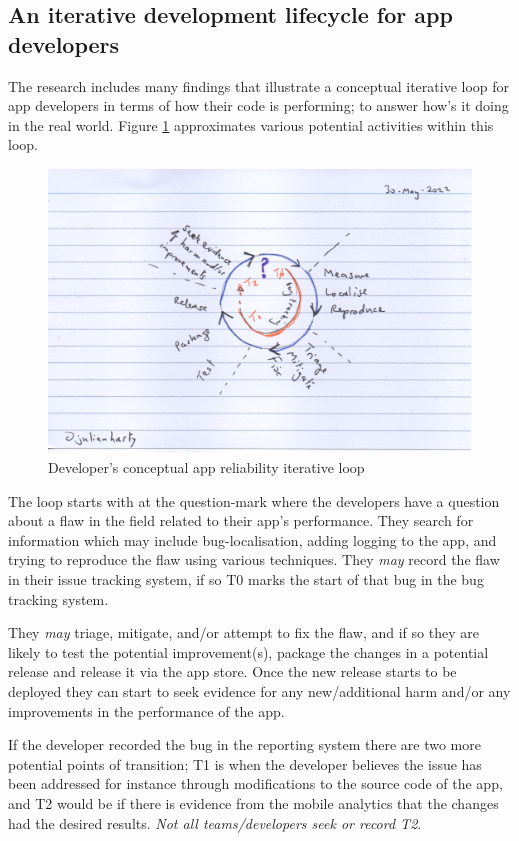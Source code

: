 \subsection{An iterative development lifecycle for app developers}
The research includes many findings that illustrate a conceptual iterative loop for app developers in terms of how their code is performing; to answer how's it doing in the real world. Figure \ref{fig:dev-app-reliability-iterative-loop} approximates various potential activities within this loop.

\begin{figure}
    \centering
    \includegraphics[width=12cm]{images/rough-sketches/dev-app-reliability-iterative-loop.jpeg}
    \caption{Developer's conceptual app reliability iterative loop}
    \label{fig:dev-app-reliability-iterative-loop}
\end{figure}

The loop starts with at the question-mark where the developers have a question about a flaw in the field related to their app's performance. They search for information which may include bug-localisation, adding logging to the app, and trying to reproduce the flaw using various techniques. They \emph{may} record the flaw in their issue tracking system, if so T0 marks the start of that bug in the bug tracking system.

They \emph{may} triage, mitigate, and/or attempt to fix the flaw, and if so they are likely to test the potential improvement(s), package the changes in a potential release and release it via the app store. Once the new release starts to be deployed they can start to seek evidence for any new/additional harm and/or any improvements in the performance of the app.

If the developer recorded the bug in the reporting system there are two more potential points of transition; T1 is when the developer believes the issue has been addressed for instance through modifications to the source code of the app, and T2 would be if there is evidence from the mobile analytics that the changes had the desired results. \emph{Not all teams/developers seek or record T2}.


